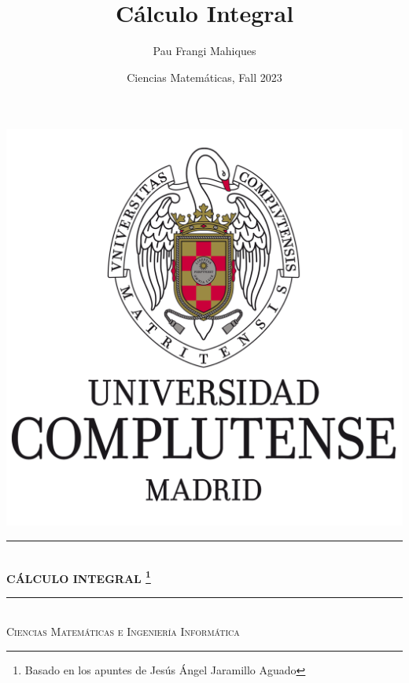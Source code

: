 \documentclass[a4paper,11pt,final]{article}
\title{Cálculo Integral}
\date{Ciencias Matemáticas, Fall 2023}
\author{Pau Frangi Mahiques}
\begin{document}
\begin{titlepage}
    
    \newcommand{\TopRule}{\rule{\linewidth}{0.3mm}}   %
    \newcommand{\BottomRule}{\rule{\linewidth}{0.5mm}} %
    
    \center %
     
    
    \vspace*{1cm}
    \includegraphics[scale=.15]{images/logo.png}\\[1cm] %

    
    \TopRule \\[0.4cm]
    { \huge \bfseries CÁLCULO INTEGRAL \footnote{Basado en los apuntes de Jesús Ángel Jaramillo Aguado}}\\[0.4cm]
    \BottomRule \\[0.5cm]    
    \textsc{\large Ciencias Matemáticas e Ingeniería Informática}\\[0.5cm] %
     

\end{titlepage}
\end{document}

